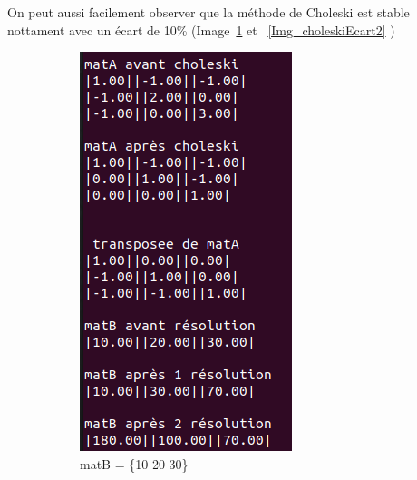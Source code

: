 \documentclass[12pt]{article}
\begin{document}
On peut aussi facilement observer que la méthode de Choleski est stable nottament avec un écart de 10\% (Image~\ref{Img_choleskiEcart1} et ~\ref{Img_choleskiEcart2} )

\begin{figure}[H]
  
  \begin{subfigure}{.5\textwidth}
    \center
    \includegraphics[width=0.8\linewidth]{img/choleskiEcart2}
    \caption{matB = \{10 20 30\}}\label{Img_choleskiEcart1}
  \end{subfigure}%
  \begin{subfigure}{.5\textwidth}
    \center

\end{subfigure}
\end{figure}
\end{document}
